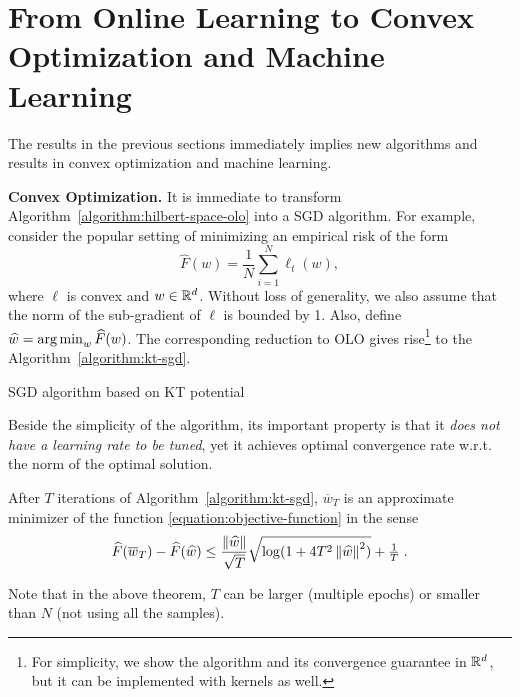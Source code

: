 \section{From Online Learning to Convex Optimization and Machine Learning}
\label{section:applications}

The results in the previous sections immediately implies new algorithms and
results in convex optimization and machine learning.

\textbf{Convex Optimization.} It is immediate to transform
Algorithm~\ref{algorithm:hilbert-space-olo} into a \ac{SGD} algorithm.  For
example, consider the popular setting of minimizing an empirical risk of the
form
\begin{equation}
\label{equation:objective-function}
\widehat{F}(w) = \frac{1}{N} \sum_{i=1}^N \ell_t(w),
\end{equation}
where $\ell$ is convex and $w \in \mathbb{R}^d$. Without loss of generality, we also
assume that the norm of the sub-gradient of $\ell$ is bounded by 1. Also,
define $\widehat{w}=  \operatorname*{arg\,min}_w \widehat{F}(w)$.  The corresponding reduction to OLO
gives rise\footnote{For simplicity, we show the algorithm and its convergence
guarantee in $\mathbb{R}^d$, but it can be implemented with kernels as well.} to the
Algorithm~\ref{algorithm:kt-sgd}.

\begin{algorithm}[t]
\caption{SGD algorithm based on KT potential \label{algorithm:kt-sgd}}
\begin{algorithmic}
{
\ENDFOR
{}
}
\end{algorithmic}
\end{algorithm}

Beside the simplicity of the algorithm, its important property is that it
\emph{does not have a learning rate to be tuned}, yet it achieves optimal
convergence rate w.r.t. the norm of the optimal solution.

\begin{theorem}
After $T$ iterations of Algorithm~\ref{algorithm:kt-sgd}, $\overline{w}_T$ is
an approximate minimizer of the function \eqref{equation:objective-function} in
the sense
$$
\widehat{F}(\overline{w}_T) - \widehat{F}(\widehat{w}) \leq \frac{\left\|{\widehat{w}}\right\|}{\sqrt{T}} \sqrt{\log(1+4 T^2 \left\|{\widehat{w}}\right\|^2)} +\tfrac{1}{T} \; .
$$
\end{theorem}
Note that in the above theorem, $T$ can be larger (multiple epochs) or smaller
than $N$ (not using all the samples).

